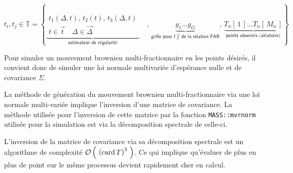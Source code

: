 \begin{equation*}
t_i, t_j \in 
\mathds T = \left\{
		\underbrace{
\begin{array}{c}
t_1(\Delta, t), \, t_2(t), \, t_3(\Delta, t )
\\
t \in \vec t \quad \Delta \in \overrightarrow \Delta
\end{array}
		}_{
			\textsf{estimateur de régularité}
		}
	  \quad , \,
	  \underbrace{
	  g_1 \dots g_G
	  }_{
		\textsf{grille pour l'} \int \textsf{ de la relation FAR} 
	  }
	  , \,
	  \underbrace{
	  	T_n[\,1\,] \dots T_n[\,M_n\,]
	  }_{
		\textsf{points observés (aléatoire)}
	  }
\right\}
\end{equation*}

Pour simuler un mouvement brownien multi-fractionnaire en les points désirés, il convient donc de simuler une loi normale multivariée d'espérance nulle et de covariance $\Sigma$.

\begin{rem}
	La méthode de génération du mouvement brownien multi-fractionnaire via une loi normale multi-variée implique l'inversion d'une matrice de covariance. La méthode utilisée pour l'inversion de cette matrice par la fonction \texttt{MASS::mvrnorm} utilisée pour la simulation est via la décomposition spectrale de celle-ci.
	
	L'inversion de la matrice de covariance via sa décomposition spectrale est un algorithme de complexité ${\mathcal O} \left( \ {(\operatorname{card}T)}^3 \ \right)$. Ce qui implique qu'évaluer de plus en plus de point sur le même processus devient rapidement cher en calcul.
	\label{rem:inversion_matrice_covariance_mfbm_informel}
\end{rem}
